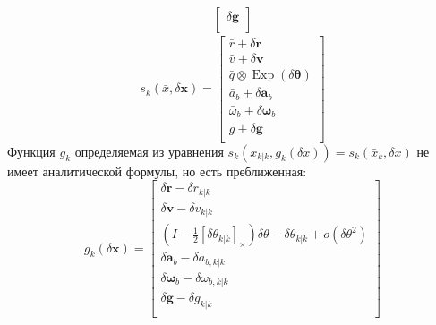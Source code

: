 \documentclass[12pt]{article}
\begin{document}
{\begin{equation}
\begin{aligned}
\begin{bmatrix}
            \delta\pmb{g}                                                      \\
        \end{bmatrix}
    \end{aligned}
\end{equation}
\begin{equation}
    s_k(\bar{x}, \delta\pmb{x})=\begin{bmatrix}
        \bar{r} + \delta\pmb{r}                                \\
        \bar{v} + \delta\pmb{v}                                \\
        \bar{q} \otimes \operatorname{Exp}(\delta\pmb{\theta}) \\
        \bar{a}_b + \delta\pmb{a}_b                            \\
        \bar{\omega}_b + \delta\pmb{\omega}_b                  \\
        \bar{g} + \delta\pmb{g}                                \\
    \end{bmatrix}
\end{equation}
}
Функция $g_k$ определяемая из уравнения  $s_k(x_{k|k}, g_k(\delta x))=s_k(\bar{x}_{k}, \delta x)$
не имеет аналитической формулы, но есть преближенная:
\begin{equation}
    g_k(\delta\pmb{x})=\begin{bmatrix}
        \delta\pmb{r} - \delta r_{k|k}                                                                                     \\
        \delta\pmb{v} - \delta v_{k|k}                                                                                     \\
        \left(I - \frac{1}{2}[\delta \theta_{k|k}]_\times \right) \delta \theta - \delta \theta_{k|k} + o(\delta \theta^2) \\
        \delta\pmb{a}_b - \delta a_{b,k|k}                                                                                 \\
        \delta\pmb{\omega}_b - \delta \omega_{b,k|k}                                                                       \\
        \delta\pmb{g} - \delta g_{k|k}                                                                                     \\
    \end{bmatrix}
\end{equation}
\end{document}

